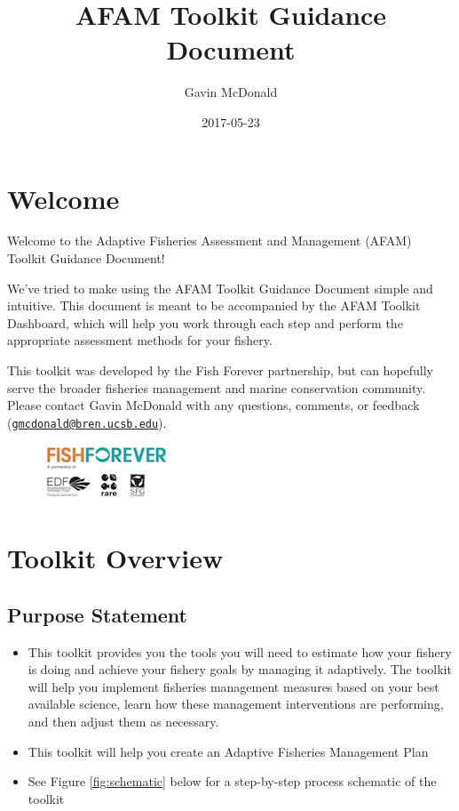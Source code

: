 \documentclass[]{book}
\title{AFAM Toolkit Guidance Document}
\author{Gavin McDonald}
\date{2017-05-23}
\begin{document}
\maketitle

{
\setcounter{tocdepth}{1}
\tableofcontents
}
\chapter*{Welcome}\label{welcome}

Welcome to the Adaptive Fisheries Assessment and Management (AFAM)
Toolkit Guidance Document!

We've tried to make using the AFAM Toolkit Guidance Document simple and
intuitive. This document is meant to be accompanied by the AFAM Toolkit
Dashboard, which will help you work through each step and perform the
appropriate assessment methods for your fishery.

This toolkit was developed by the Fish Forever partnership, but can
hopefully serve the broader fisheries management and marine conservation
community. Please contact Gavin McDonald with any questions, comments,
or feedback
(\href{mailto:gmcdonald@bren.ucsb.edu}{\nolinkurl{gmcdonald@bren.ucsb.edu}}).

\begin{figure}
\centering
\includegraphics{myMediaFolder/media/FF_Logo.png}
\caption{}
\end{figure}

\chapter*{Toolkit Overview}\label{toolkit-overview}

\section{Purpose Statement}\label{purpose-statement}

\begin{itemize}
\item
  This toolkit provides you the tools you will need to estimate how your
  fishery is doing and achieve your fishery goals by managing it
  adaptively. The toolkit will help you implement fisheries management
  measures based on your best available science, learn how these
  management interventions are performing, and then adjust them as
  necessary.
\item
  This toolkit will help you create an Adaptive Fisheries Management
  Plan
\item
  See Figure \protect\hyperlink{fig:schematic}{\ref{fig:schematic}}
  below for a step-by-step process schematic of the toolkit
\end{itemize}
\end{document}
